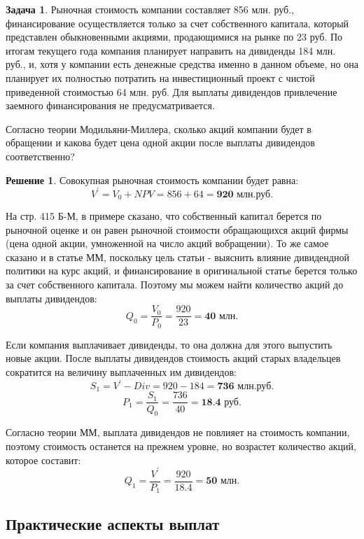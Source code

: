 \documentclass[a4paper, 14pt]{article}
\theoremstyle{plain} %
\theoremstyle{definition} %
\newtheorem*{solution}{Решение}
\newtheorem{problem}{Задача}[subsection]
\theoremstyle{remark} %
\begin{document}
\begin{problem}
	Рыночная стоимость компании составляет 856 млн. руб., финансирование осуществляется только за счет собственного капитала, который представлен обыкновенными акциями, продающимися на рынке по 23 руб. По итогам текущего года компания планирует направить на дивиденды 184 млн. руб., и, хотя у компании есть денежные средства именно в данном объеме, но она планирует их полностью потратить на инвестиционный проект с чистой приведенной  стоимостью  64  млн.  руб.  Для  выплаты  дивидендов  привлечение  заемного финансирования не предусматривается.

	Согласно теории Модильяни-Миллера, сколько акций компании будет в обращении и какова будет цена одной акции после выплаты дивидендов соответственно?
	\begin{solution}
		Совокупная рыночная стоимость компании будет равна:
		\[V^{'} = V_{0} + NPV = 856 + 64 = \textbf{920 млн.руб.}\]

		На стр. 415 Б-М, в примере сказано, что собственный капитал берется по рыночной оценке и он равен рыночной стоимости обращающихся акций фирмы (цена одной акции, умноженной на число акций вобращении). То же самое сказано и в статье ММ, поскольку цель статьи - выяснить влияние дивидендной политики на курс акций, и финансирование в оригинальной статье берется только за счет собственного капитала. Поэтому мы можем найти количество акций до выплаты дивидендов:
		\[Q_{0} = \frac{V_{0}}{P_{0}} = \frac{920}{23} = \textbf{40 млн.}\]

		Если компания выплачивает дивиденды, то она должна для этого выпустить новые акции. После выплаты дивидендов стоимость акций старых владельцев сократится на величину выплаченных им дивидендов:
		\[S_{1} = V^{'} - Div = 920 - 184 = \textbf{736 млн.руб.}\]
		\[P_{1} = \frac{S_{1}}{Q_{0}} = \frac{736}{40} = \textbf{18.4 руб.}\]

		Согласно теории ММ, выплата дивидендов не повлияет на стоимость компании, поэтому стоимость останется на прежнем уровне, но возрастет количество акций, которое составит:
		\[Q_{1} = \frac{V^{'}}{P_{1}} = \frac{920}{18.4} = \textbf{50 млн.}\]
	\end{solution}
\end{problem}
\subsection{Практические аспекты выплат}
\end{document}

